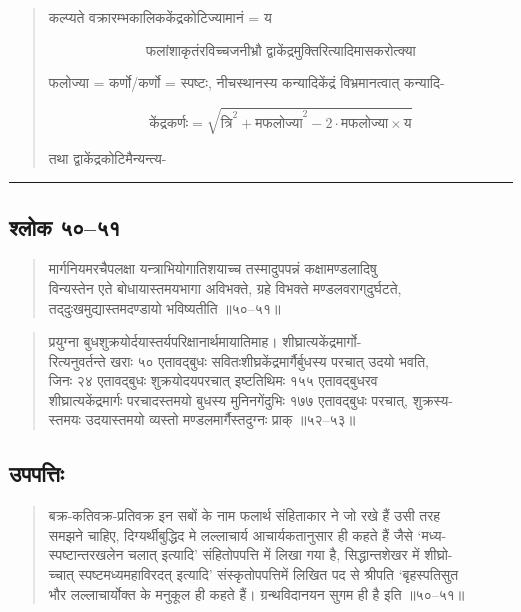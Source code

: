 \documentclass[11pt,a4paper]{article}
\newcommand{\longline}{\noindent\rule{\textwidth}{0.4pt}}
\newcommand{\dev}[1]{{\devanagarifont #1}}
\newenvironment{shloka}{%
  \begin{quote}
  \small
  \setlength{\leftmargin}{2em}
  \devanagarifont
}{\end{quote}}
\newenvironment{vyakhya}{%
  \begin{quote}
  \small
  \setlength{\leftmargin}{1em}
  \devanagarifont
}{\end{quote}}
\newcommand{\skt}[1]{{\devanagarifont #1}}
\begin{document}
\begin{vyakhya}
\skt{कल्प्यते वक्रारम्भकालिककेंद्रकोटिज्यामानं = य}

\begin{equation*}
\text{फलांशाकृतंरविच्चजनीभ्रौ द्वाकेंद्रमुक्तिरित्यादिमासकरोत्क्या}
\end{equation*}

\skt{फलोज्या = कर्णो/कर्णो = स्पष्टः, नीचस्थानस्य कन्यादिकेंद्रं विभ्रमानत्वात् कन्यादि-}

\begin{equation*}
\text{केंद्रकर्णः} = \sqrt{\text{त्रि}^{2} + \text{मफलोज्या}^{2} - 2 \cdot \text{मफलोज्या} \times \text{य}}
\end{equation*}

\skt{तथा द्वाकेंद्रकोटिमैन्यन्त्य-}
\end{vyakhya}

\longline

\subsection{\dev{श्लोक ५०--५१}}

\begin{shloka}
\skt{मार्गनियमरचैपलक्षा यन्त्राभियोगातिशयाच्च तस्मादुपपन्नं कक्षामण्डलादिषु}\\
\skt{विन्यस्तेन एते बोधायास्तमयभागा अविभक्ते, ग्रहे विभक्ते मण्डलवराग्‌दुर्घटते,}\\
\skt{तद्‌दुःखमुद्यास्तमदण्डायो भविष्यतीति ॥५०--५१॥}
\end{shloka}

\begin{vyakhya}
\skt{प्रयुग्ना बुधशुक्रयोर्दयास्तर्यपरिक्षानार्थमायातिमाह। शीघ्रात्यकेंद्रमार्गो-}\\
\skt{रित्यनुवर्तन्ते खराः ५० एतावद्‌बुधः सवितःशीघ्रकेंद्रमार्गैर्बुधस्य परचात् उदयो भवति,}\\
\skt{जिनः २४ एतावद्‌बुधः शुक्रयोदयपरचात् इष्टतिथिमः १५५ एतावद्‌बुधरव}\\
\skt{शीघ्रात्यकेंद्रमार्गः परचादस्तमयो बुधस्य मुनिनगेंदुभिः १७७ एतावद्‌बुधः परचात्, शुक्रस्य-}\\
\skt{स्तमयः उदयास्तमयो व्यस्तो मण्डलमार्गैस्तदुग्नः प्राक् ॥५२--५३॥}
\end{vyakhya}

\subsection{\dev{उपपत्तिः}}

\begin{vyakhya}
\skt{बक्र-कतिवक्र-प्रतिवक्र इन सबों के नाम फलार्थ संहिताकार ने जो रखे हैं उसी तरह}\\
\skt{समझने चाहिए, दिग्यर्थीबुद्धिद मे लल्लाचार्य आचार्यकतानुसार ही कहते हैं जैसे ‘मध्य-}\\
\skt{स्पष्टान्तरखलेन चलात् इत्यादि’ संहितोपपत्ति में लिखा गया है, सिद्धान्तशेखर में शीघ्रो-}\\
\skt{च्चात् स्पष्टमध्यमहाविरदत् इत्यादि’ संस्कृतोपपत्तिमें लिखित पद से श्रीपति ‘बृहस्पतिसुत}\\
\skt{भौर लल्लाचार्योक्त के मनुकूल ही कहते हैं। ग्रन्थविदानयन सुगम ही है इति ॥५०--५१॥}
\end{vyakhya}
\end{document}
